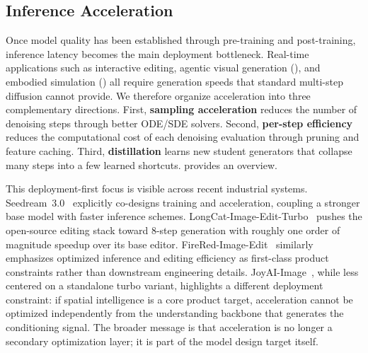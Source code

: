 \documentclass{llmxive}
\begin{document}
\subsection{Inference Acceleration}
\label{subsec:acceleration}

Once model quality has been established through pre-training and post-training, inference latency becomes the main deployment bottleneck. Real-time applications such as interactive editing, agentic visual generation (), and embodied simulation () all require generation speeds that standard multi-step diffusion cannot provide. We therefore organize acceleration into three complementary directions. First, \textbf{sampling acceleration} reduces the number of denoising steps through better ODE/SDE solvers. Second, \textbf{per-step efficiency} reduces the computational cost of each denoising evaluation through pruning and feature caching. Third, \textbf{distillation} learns new student generators that collapse many steps into a few learned shortcuts.  provides an overview.

This deployment-first focus is visible across recent industrial systems. Seedream~3.0~\citep{gao2025seedream} explicitly co-designs training and acceleration, coupling a stronger base model with faster inference schemes. LongCat-Image-Edit-Turbo~\citep{team2025longcat} pushes the open-source editing stack toward 8-step generation with roughly one order of magnitude speedup over its base editor. FireRed-Image-Edit~\citep{team2026firered} similarly emphasizes optimized inference and editing efficiency as first-class product constraints rather than downstream engineering details. JoyAI-Image~\citep{jdjoyaiimage}, while less centered on a standalone turbo variant, highlights a different deployment constraint: if spatial intelligence is a core product target, acceleration cannot be optimized independently from the understanding backbone that generates the conditioning signal. The broader message is that acceleration is no longer a secondary optimization layer; it is part of the model design target itself.
\end{document}
